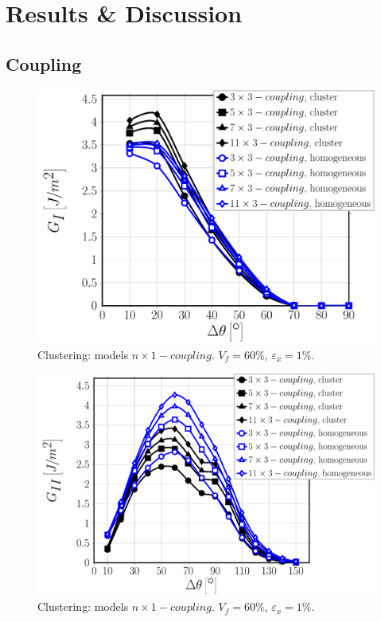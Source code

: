 \documentclass[review]{elsarticle}
\begin{document}
\section{Results \& Discussion}

\subsection{Coupling}\label{subsec:coupling}

\begin{figure}[!h]
\centering
\includegraphics[width=\textwidth]{nx1-coupling-vf60-GI.pdf}
\caption{Clustering: models $n\times 1-coupling$. $V_{f}=60\%$, $\varepsilon_{x}=1\%$.}\label{fig:debonddebondGI}
\end{figure}

\begin{figure}[!h]
\centering
\includegraphics[width=\textwidth]{nx1-coupling-vf60-GII.pdf}
\caption{Clustering: models $n\times 1-coupling$. $V_{f}=60\%$, $\varepsilon_{x}=1\%$.}\label{fig:debonddebondGI}
\end{figure}
\end{document}
